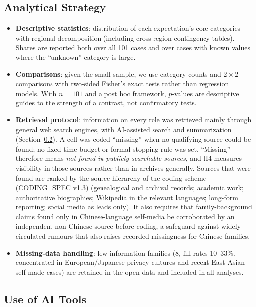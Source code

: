 \documentclass[11pt,a4paper]{article}
\begin{document}
\subsection{Analytical Strategy}
\label{sec:strategy}

\begin{itemize}
\item \textbf{Descriptive statistics}: distribution of each expectation's core categories with regional decomposition (including cross-region contingency tables). Shares are reported both over all 101 cases and over cases with known values where the ``unknown'' category is large.
\item \textbf{Comparisons}: given the small sample, we use category counts and $2\times2$ comparisons with two-sided Fisher's exact tests rather than regression models. With $n=101$ and a post hoc framework, $p$-values are descriptive guides to the strength of a contrast, not confirmatory tests.
\item \textbf{Retrieval protocol}: information on every role was retrieved mainly through general web search engines, with AI-assisted search and summarization (Section~\ref{sec:ai}). A cell was coded ``missing'' when no qualifying source could be found; no fixed time budget or formal stopping rule was set. ``Missing'' therefore means \emph{not found in publicly searchable sources}, and H4 measures visibility in those sources rather than in archives generally. Sources that were found are ranked by the source hierarchy of the coding scheme (CODING\_SPEC v1.3) (genealogical and archival records; academic work; authoritative biographies; Wikipedia in the relevant languages; long-form reporting; social media as leads only). It also requires that family-background claims found only in Chinese-language self-media be corroborated by an independent non-Chinese source before coding, a safeguard against widely circulated rumours that also raises recorded missingness for Chinese families.
\item \textbf{Missing-data handling}: low-information families (8, fill rates 10--33\%, concentrated in European/Japanese privacy cultures and recent East Asian self-made cases) are retained in the open data and included in all analyses.
\end{itemize}

\subsection{Use of AI Tools}
\label{sec:ai}
\end{document}
